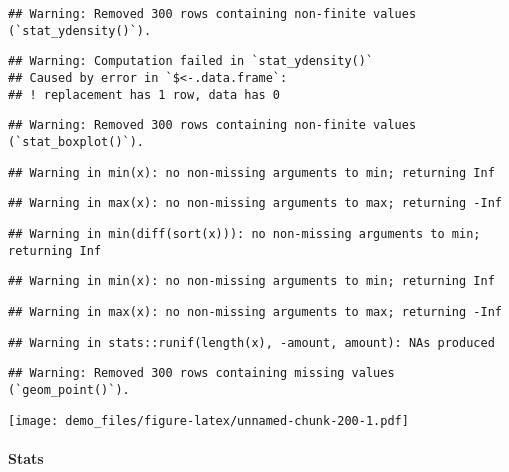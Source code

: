 \documentclass[]{book}
\let\oldparagraph\paragraph
\renewcommand{\paragraph}[1]{\oldparagraph{#1}\mbox{}}
\begin{document}
\begin{verbatim}
## Warning: Removed 300 rows containing non-finite values (`stat_ydensity()`).
\end{verbatim}

\begin{verbatim}
## Warning: Computation failed in `stat_ydensity()`
## Caused by error in `$<-.data.frame`:
## ! replacement has 1 row, data has 0
\end{verbatim}

\begin{verbatim}
## Warning: Removed 300 rows containing non-finite values (`stat_boxplot()`).
\end{verbatim}

\begin{verbatim}
## Warning in min(x): no non-missing arguments to min; returning Inf
\end{verbatim}

\begin{verbatim}
## Warning in max(x): no non-missing arguments to max; returning -Inf
\end{verbatim}

\begin{verbatim}
## Warning in min(diff(sort(x))): no non-missing arguments to min; returning Inf
\end{verbatim}

\begin{verbatim}
## Warning in min(x): no non-missing arguments to min; returning Inf
\end{verbatim}

\begin{verbatim}
## Warning in max(x): no non-missing arguments to max; returning -Inf
\end{verbatim}

\begin{verbatim}
## Warning in stats::runif(length(x), -amount, amount): NAs produced
\end{verbatim}

\begin{verbatim}
## Warning: Removed 300 rows containing missing values (`geom_point()`).
\end{verbatim}

\texttt{[image: demo\_files/figure-latex/unnamed-chunk-200-1.pdf]}

\hypertarget{stats-84}{%
\paragraph{Stats}\label{stats-84}}
\end{document}
